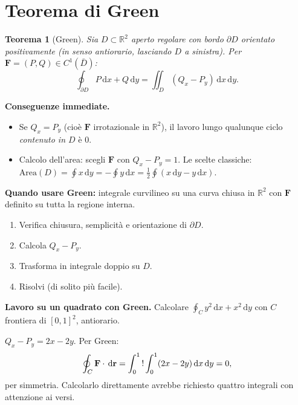 \documentclass[11pt,a4paper,openany]{book}
\theoremstyle{plain}
\newtheorem{teorema}{Teorema}[chapter]
\theoremstyle{definition}
\theoremstyle{remark}
\newcommand{\R}{\mathbb{R}}
\newcommand{\dd}{\,\mathrm{d}}
\newcommand{\F}{\mathbf{F}}
\newcommand{\rr}{\mathbf{r}}
\begin{document}
\section{Teorema di Green}

\begin{teorema}[Green]
Sia $D\subset\R^2$ aperto regolare con bordo $\partial D$ orientato
\emph{positivamente} (in senso antiorario, lasciando $D$ a sinistra). Per
$\F=(P,Q)\in C^1(\bar D)$:
\begin{equation}
  \oint_{\partial D}P\dd x+Q\dd y=\iint_D(Q_x-P_y)\dd x\dd y.
  \label{eq:green}
\end{equation}
\end{teorema}

\begin{nota}
\textbf{Conseguenze immediate.}
\begin{itemize}[leftmargin=*]
  \item Se $Q_x=P_y$ (cio\`e $\F$ irrotazionale in $\R^2$), il lavoro lungo
        qualunque ciclo \emph{contenuto in $D$} \`e $0$.
  \item Calcolo dell'area: scegli $\F$ con $Q_x-P_y=1$. Le scelte classiche:
        $\text{Area}(D)=\oint x\dd y=-\oint y\dd x=\frac12\oint(x\dd y-y\dd x)$.
\end{itemize}
\end{nota}

\begin{ricetta}
\textbf{Quando usare Green:} integrale curvilineo su una curva chiusa in
$\R^2$ con $\F$ definito su tutta la regione interna.
\begin{enumerate}[leftmargin=*]
  \item Verifica chiusura, semplicit\`a e orientazione di $\partial D$.
  \item Calcola $Q_x-P_y$.
  \item Trasforma in integrale doppio su $D$.
  \item Risolvi (di solito pi\`u facile).
\end{enumerate}
\end{ricetta}

\begin{esempio}
\textbf{Lavoro su un quadrato con Green.} Calcolare
$\oint_C y^2\dd x+x^2\dd y$ con $C$ frontiera di $[0,1]^2$, antiorario.

$Q_x-P_y=2x-2y$. Per Green:
\[
  \oint_C\F\cdot\dd\rr=\int_0^1\\!\int_0^1(2x-2y)\dd x\dd y=0,
\]
per simmetria. Calcolarlo direttamente avrebbe richiesto quattro integrali
con attenzione ai versi.
\end{esempio}
\end{document}

